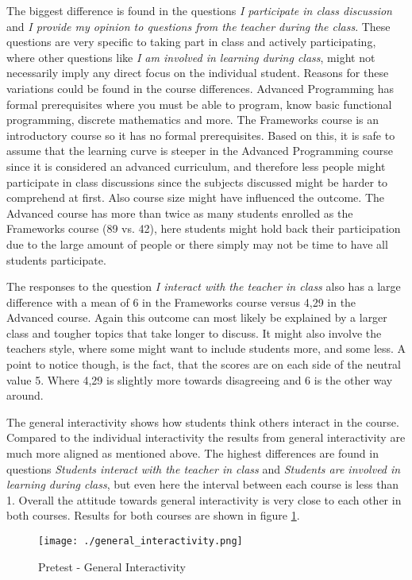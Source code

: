 The biggest difference is found in the questions \emph{I participate in class discussion} and \emph{I provide my opinion to questions from the teacher during the class}. These questions are very specific to taking part in class and actively participating, where other questions like \emph{I am involved in learning during class}, might not necessarily imply any direct focus on the individual student. Reasons for these variations could be found in the course differences. Advanced Programming has formal prerequisites where you must be able to program, know basic functional programming, discrete mathematics and more. The Frameworks course is an introductory course so it has no formal prerequisites. Based on this, it is safe to assume that the learning curve is steeper in the Advanced Programming course since it is considered an advanced curriculum, and therefore less people might participate in class discussions since the subjects discussed might be harder to comprehend at first. Also course size might have influenced the outcome. The Advanced course has more than twice as many students enrolled as the Frameworks course (89 vs. 42), here students might hold back their participation due to the large amount of people or there simply may not be time to have all students participate.

The responses to the question \emph{I interact with the teacher in class} also has a large difference with a mean of 6 in the Frameworks course versus 4,29 in the Advanced course. Again this outcome can most likely be explained by a larger class and tougher topics that take longer to discuss. It might also involve the teachers style, where some might want to include students more, and some less. A point to notice though, is the fact, that the scores are on each side of the neutral value 5. Where 4,29 is slightly more towards disagreeing and 6 is the other way around.

The general interactivity shows how students think others interact in the course. Compared to the individual interactivity the results from general interactivity are much more aligned as mentioned above. The highest differences are found in questions \emph{Students interact with the teacher in class} and \emph{Students are involved in learning during class}, but even here the interval between each course is less than 1. Overall the attitude towards general interactivity is very close to each other in both courses. Results for both courses are shown in figure \ref{fig:general_interactivity}.

 \begin{figure}[H]
  \centering
     \texttt{[image: ./general\_interactivity.png]}
     \caption{Pretest - General Interactivity}
     \label{fig:general_interactivity}
 \end{figure}


